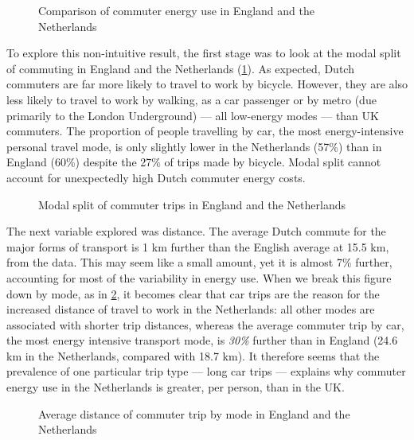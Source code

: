 \begin{figure}
 \caption[Comparison of commuter energy use in England and the Netherlands]
 {Comparison of commuter energy use in England and the Netherlands}
\end{figure}

To explore this non-intuitive result, the first stage was to look at the modal
split of commuting in England and the Netherlands (\cref{fdutchmode}).
As expected, Dutch commuters are far more likely to travel to work by bicycle.
However, they are also less likely to travel to work by walking, as a car
passenger or by metro (due primarily to the London Underground) --- all low-energy
modes --- than UK commuters. The proportion of people travelling by car,
the most energy-intensive personal travel mode, is  only slightly lower in the
Netherlands (57\%) than in England (60\%) despite the 27\% of trips made by
bicycle. Modal split cannot account for
unexpectedly high Dutch commuter energy costs.

\begin{figure}
 \caption[Modal split of commuter trips in England and the Netherlands]
 {Modal split of commuter trips in England and the
Netherlands}\label{fdutchmode}
\end{figure}

The next variable explored was distance. The average Dutch
commute for the major forms of transport %
is 1 km further than the English average at 15.5 km, from the data.
This may seem like a small amount, yet it is almost 7\% further, accounting for
most of the variability in energy use. When we
break this figure down by mode, as in \cref{favdistnl}, it becomes clear that
car trips are the reason for the increased distance of travel to work
in the Netherlands: all other modes are associated with shorter trip distances,
whereas the average commuter trip by car, the most energy intensive transport
mode, is \emph{30\%} further than in England (24.6 km in
the Netherlands, compared with 18.7 km). It therefore seems that
the prevalence of one particular trip type --- long car trips --- explains why
commuter energy use in the Netherlands is greater, per person, than in the UK.


\begin{figure}
 \caption[Distance of commuting by mode, England and the Netherlands]
 {Average distance of commuter trip by mode in England and the
Netherlands}\label{favdistnl}
\end{figure}

